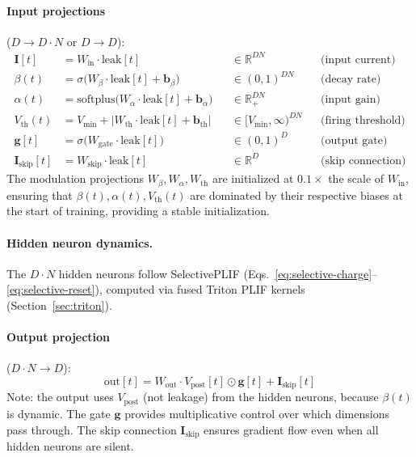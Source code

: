 \documentclass[10pt,twocolumn]{article}
\newcommand{\vpost}{V_{\text{post}}}
\newcommand{\vth}{V_{\text{th}}}
\newcommand{\vmin}{V_{\text{min}}}
\newcommand{\R}{\mathbb{R}}
\begin{document}
\paragraph{Input projections} ($D \to D \cdot N$ or $D \to D$):
\begin{align}
    \mathbf{I}[t] &= W_{\text{in}} \cdot \text{leak}[t] & &\in \R^{DN} & &\text{(input current)} \label{eq:block-I} \\
    \beta(t) &= \sigma\big(W_\beta \cdot \text{leak}[t] + \mathbf{b}_\beta\big) & &\in (0,1)^{DN} & &\text{(decay rate)} \label{eq:block-beta} \\
    \alpha(t) &= \text{softplus}\big(W_\alpha \cdot \text{leak}[t] + \mathbf{b}_\alpha\big) & &\in \R_+^{DN} & &\text{(input gain)} \label{eq:block-alpha} \\
    \vth(t) &= \vmin + \big|W_{\text{th}} \cdot \text{leak}[t] + \mathbf{b}_{\text{th}}\big| & &\in [\vmin, \infty)^{DN} & &\text{(firing threshold)} \label{eq:block-vth} \\
    \mathbf{g}[t] &= \sigma\big(W_{\text{gate}} \cdot \text{leak}[t]\big) & &\in (0,1)^D & &\text{(output gate)} \label{eq:block-gate} \\
    \mathbf{I}_{\text{skip}}[t] &= W_{\text{skip}} \cdot \text{leak}[t] & &\in \R^D & &\text{(skip connection)} \label{eq:block-skip}
\end{align}
The modulation projections $W_\beta, W_\alpha, W_{\text{th}}$ are initialized at $0.1\times$ the scale of $W_{\text{in}}$, ensuring that $\beta(t), \alpha(t), \vth(t)$ are dominated by their respective biases at the start of training, providing a stable initialization.

\paragraph{Hidden neuron dynamics.}
The $D \cdot N$ hidden neurons follow SelectivePLIF (Eqs.~\ref{eq:selective-charge}--\ref{eq:selective-reset}), computed via fused Triton PLIF kernels (Section~\ref{sec:triton}).

\paragraph{Output projection} ($D \cdot N \to D$):
\begin{equation}
    \text{out}[t] = W_{\text{out}} \cdot \vpost[t] \odot \mathbf{g}[t] + \mathbf{I}_{\text{skip}}[t]
    \label{eq:block-out}
\end{equation}
Note: the output uses $\vpost$ (not leakage) from the hidden neurons, because $\beta(t)$ is dynamic.
The gate $\mathbf{g}$ provides multiplicative control over which dimensions pass through.
The skip connection $\mathbf{I}_{\text{skip}}$ ensures gradient flow even when all hidden neurons are silent.
\end{document}
